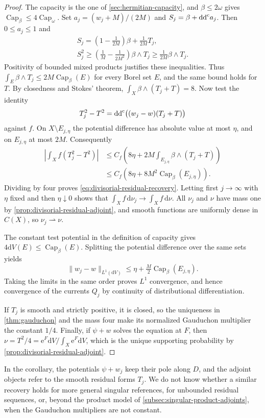 \begin{proof}
The capacity is the one of \cref{sec:hermitian-capacity}, and $\beta\leq2\omega$ gives $\operatorname{Cap}_\beta\leq4\operatorname{Cap}_\omega$. Set $a_j=(w_j+M)/(2M)$ and $S_j=\beta+\mathrm{dd}^{\mathrm{c}} a_j$. Then $0\leq a_j\leq1$ and
\[
 \begin{gathered}
 S_j=\left(1-\frac1{2M}\right)\beta+\frac1{2M}T_j,\\
 S_j^2\geq\left(\frac1M-\frac1{2M^2}\right)\beta\wedge T_j
 \geq\frac1{2M}\beta\wedge T_j.
 \end{gathered}
\]
Positivity of bounded mixed products justifies these inequalities. Thus $\int_E\beta\wedge T_j\leq2M\operatorname{Cap}_\beta(E)$ for every Borel set $E$, and the same bound holds for $T$. By closedness and Stokes' theorem, $\int_X\beta\wedge(T_j+T)=8$. Now test the identity
\[
 T_j^2-T^2=\mathrm{dd}^{\mathrm{c}}\bigl((w_j-w)(T_j+T)\bigr)
\]
against $f$. On $X\setminus E_{j,\eta}$ the potential difference has absolute value at most $\eta$, and on $E_{j,\eta}$ at most $2M$. Consequently
\[
 \begin{aligned}
 \left|\int_Xf(T_j^2-T^2)\right|
 &\leq C_f\left(8\eta+2M\int_{E_{j,\eta}}\beta\wedge(T_j+T)\right)\\
 &\leq C_f\left(8\eta+8M^2\operatorname{Cap}_\beta(E_{j,\eta})\right).
 \end{aligned}
\]
Dividing by four proves \eqref{eq:divisorial-residual-recovery}. Letting first $j\to\infty$ with $\eta$ fixed and then $\eta\downarrow0$ shows that $\int_Xf\,\mathrm d\nu_j\to\int_Xf\,\mathrm d\nu$. All $\nu_j$ and $\nu$ have mass one by \cref{prop:divisorial-residual-adjoint}, and smooth functions are uniformly dense in $C(X)$, so $\nu_j\rightharpoonup\nu$.

The constant test potential in the definition of capacity gives $4\mathrm dV(E)\leq\operatorname{Cap}_\beta(E)$. Splitting the potential difference over the same sets yields
\[
 \|w_j-w\|_{L^1(\mathrm dV)}
 \leq\eta+\tfrac M2\operatorname{Cap}_\beta(E_{j,\eta}).
\]
Taking the limits in the same order proves $L^1$ convergence, and hence convergence of the currents $Q_j$ by continuity of distributional differentiation.

If $T_j$ is smooth and strictly positive, it is closed, so the uniqueness in \cref{thm:gauduchon} and the mass four make its normalized Gauduchon multiplier the constant $1/4$. Finally, if $\psi+w$ solves the equation at $F$, then $\nu=T^2/4=\mathrm e^F\mathrm dV/\int_X\mathrm e^F\mathrm dV$, which is the unique supporting probability by \cref{prop:divisorial-residual-adjoint}.
\end{proof}

In the corollary, the potentials $\psi+w_j$ keep their pole along $D$, and the adjoint objects refer to the smooth residual forms $T_j$. We do not know whether a similar recovery holds for more general singular references, for unbounded residual sequences, or, beyond the product model of \cref{subsec:singular-product-adjoints}, when the Gauduchon multipliers are not constant.
